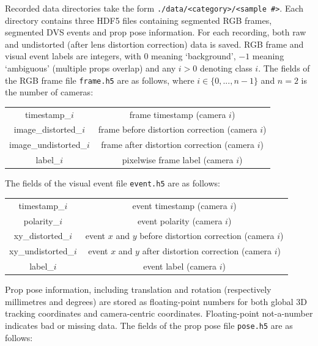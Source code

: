 \documentclass{article}
\begin{document}
Recorded data directories take the form \lstinline|./data/<category>/<sample #>|. Each directory contains three HDF5 files containing segmented RGB frames, segmented DVS events and prop pose information. For each recording, both raw and undistorted (after lens distortion correction) data is saved. RGB frame and visual event labels are integers, with $0$ meaning `background', $-1$ meaning `ambiguous' (multiple props overlap) and any $i > 0$ denoting class $i$. The fields of the RGB frame file \lstinline|frame.h5| are as follows, where $i \in \{0,...,n-1\}$ and $n = 2$ is the number of cameras:
\begin{center}
	\begin{tabular}{|c|c|}
		timestamp\_$i$           & frame timestamp (camera $i$) \\
		image\_distorted\_$i$    & frame before distortion correction (camera $i$) \\
		image\_undistorted\_$i$  & frame after distortion correction (camera $i$) \\
		label\_$i$               & pixelwise frame label (camera $i$) \\
	\end{tabular}
\end{center}
The fields of the visual event file \lstinline|event.h5| are as follows:
\begin{center}
	\begin{tabular}{|c|c|}
		timestamp\_$i$        & event timestamp (camera $i$) \\
		polarity\_$i$         & event polarity (camera $i$) \\
		xy\_distorted\_$i$    & event $x$ and $y$ before distortion correction (camera $i$) \\
		xy\_undistorted\_$i$  & event $x$ and $y$ after distortion correction (camera $i$) \\
		label\_$i$            & event label (camera $i$) \\
	\end{tabular}
\end{center}
Prop pose information, including translation and rotation (respectively millimetres and degrees) are stored as floating-point numbers for both global 3D tracking coordinates and camera-centric coordinates. Floating-point not-a-number indicates bad or missing data. The fields of the prop pose file \lstinline|pose.h5| are as follows:
\end{document}
